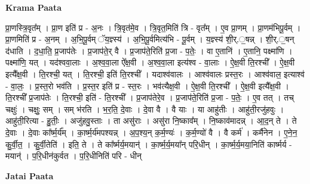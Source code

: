 \documentclass[17pt]{extarticle}
\begin{document}
\textbf{Krama Paata} \newline

प्रा॒णस्त्रि॒वृत᳚म् । प्रा॒ण इति॑ प्र - अ॒नः । त्रि॒वृत॑मे॒व । त्रि॒वृत॒मिति॑ त्रि - वृत᳚म् । ए॒व प्रा॒णम् । प्रा॒णम॑भिपू॒र्वम् । प्रा॒णमिति॑ प्र - अ॒नम् । अ॒भि॒पू॒र्वम् ॅय॒ज्ञ्स्य॑ । अ॒भि॒पू॒र्वमित्य॑भि - पू॒र्वम् । य॒ज्ञ्स्य॑ शी॒र्.॒षन्न् । शी॒र्.॒षन् द॑धाति । द॒धा॒ति॒ प्र॒जाप॑तेः । प्र॒जाप॑ते॒र् वै । प्र॒जाप॑ते॒रिति॑ प्र॒जा - प॒तेः॒ । वा ए॒तानि॑ । ए॒तानि॒ पक्ष्मा॑णि । पक्ष्मा॑णि॒ यत् । यद॑श्ववा॒लाः । अ॒श्व॒वा॒ला ऐ᳚क्ष॒वी । अ॒श्व॒वा॒ला इत्य॑श्व - वा॒लाः । ऐ॒क्ष॒वी ति॒रश्ची᳚ । ऐ॒क्ष॒वी इत्यै᳚क्ष॒वी । ति॒रश्ची॒ यत् । ति॒रश्ची॒ इति॑ ति॒रश्ची᳚ । यदाश्व॑वालः । आश्व॑वालः प्रस्त॒रः । आश्व॑वाल॒ इत्याश्व॑ - वा॒लः॒ । प्र॒स्त॒रो भव॑ति । प्र॒स्त॒र इति॑ प्र - स्त॒रः । भव॑त्यैक्ष॒वी । ऐ॒क्ष॒वी ति॒रश्ची᳚ । ऐ॒क्ष॒वी इत्यै᳚क्ष॒वी । ति॒रश्ची᳚ प्र॒जाप॑तेः । ति॒रश्ची॒ इति॑ - ति॒रश्ची᳚ । प्र॒जाप॑तेरे॒व । प्र॒जाप॑ते॒रिति॑ प्र॒जा - प॒तेः॒ । ए॒व तत् । तच् चक्षुः॑ । चक्षुः॒ सम् । सम् भ॑रति । भ॒र॒ति॒ दे॒वाः । दे॒वा वै । वै याः । या आहु॑तीः । आहु॑ती॒रजु॑हवुः । आहु॑ती॒रित्या - हु॒तीः॒ । अजु॑हवु॒स्ताः । ता असु॑राः । असु॑रा नि॒ष्काव᳚म् । नि॒ष्काव॑मादन्न् । आ॒द॒न् ते । ते दे॒वाः । दे॒वाः का᳚र्ष्म॒र्य᳚म् । का॒र्ष्म॒र्य॑मपश्यन्न् । अ॒प॒श्य॒न् क॒र्म॒ण्यः॑ । क॒र्म॒ण्यो॑ वै । वै कर्म॑ । कर्मै॑नेन । ए॒ने॒न॒ कु॒र्वी॒त॒ । कु॒र्वी॒तेति॑ । इति॒ ते । ते का᳚र्ष्मर्य॒मयान्॑ । का॒र्ष्म॒र्य॒मया᳚न् परि॒धीन् । का॒र्ष्म॒र्य॒मया॒निति॑ कार्ष्मर्य - मयान्॑ । प॒रि॒धीन॑कुर्वत । प॒रि॒धीनिति॑ परि - धीन् \newline

\textbf{Jatai Paata} \newline
\end{document}
